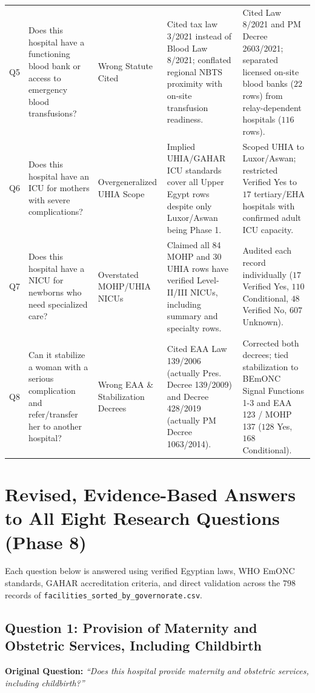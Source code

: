 \documentclass[10pt,a4paper]{article}
\begin{document}
{\begin{longtable}{p{0.8cm} p{3.8cm} p{2.8cm} p{4.8cm} p{3.6cm}}
Q5 & Does this hospital have a functioning blood bank or access to emergency blood transfusions? & Wrong Statute Cited & Cited tax law 3/2021 instead of Blood Law 8/2021; conflated regional NBTS proximity with on-site transfusion readiness. & Cited Law 8/2021 and PM Decree 2603/2021; separated licensed on-site blood banks ($22$ rows) from relay-dependent hospitals ($116$ rows). \\[0.3em]
Q6 & Does this hospital have an ICU for mothers with severe complications? & Overgeneralized UHIA Scope & Implied UHIA/GAHAR ICU standards cover all Upper Egypt rows despite only Luxor/Aswan being Phase 1. & Scoped UHIA to Luxor/Aswan; restricted Verified Yes to $17$ tertiary/EHA hospitals with confirmed adult ICU capacity. \\[0.3em]
Q7 & Does this hospital have a NICU for newborns who need specialized care? & Overstated MOHP/UHIA NICUs & Claimed all 84 MOHP and 30 UHIA rows have verified Level-II/III NICUs, including summary and specialty rows. & Audited each record individually ($17$ Verified Yes, $110$ Conditional, $48$ Verified No, $607$ Unknown). \\[0.3em]
Q8 & Can it stabilize a woman with a serious complication and refer/transfer her to another hospital? & Wrong EAA \& Stabilization Decrees & Cited EAA Law 139/2006 (actually Pres. Decree 139/2009) and Decree 428/2019 (actually PM Decree 1063/2014). & Corrected both decrees; tied stabilization to BEmONC Signal Functions 1-3 and EAA 123 / MOHP 137 ($128$ Yes, $168$ Conditional). \\
\end{longtable}
}

\section{Revised, Evidence-Based Answers to All Eight Research Questions (Phase 8)}

Each question below is answered using verified Egyptian laws, WHO EmONC standards, GAHAR accreditation criteria, and direct validation across the $798$ records of \texttt{facilities\_sorted\_by\_governorate.csv}.

\subsection{Question 1: Provision of Maternity and Obstetric Services, Including Childbirth}
\textbf{Original Question:} \textit{``Does this hospital provide maternity and obstetric services, including childbirth?''}
\end{document}
